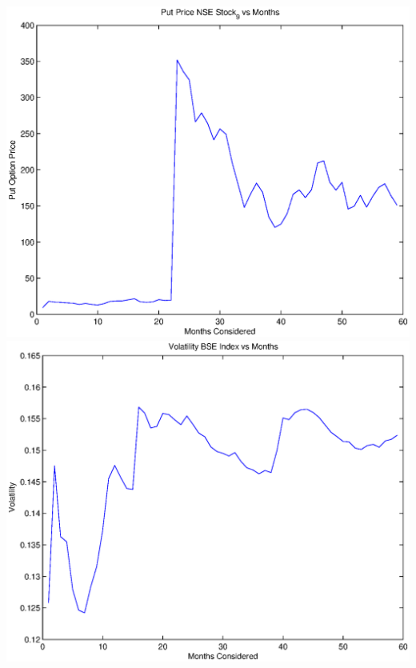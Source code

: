 \documentclass{article}
\begin{document}
\includegraphics[width=\textwidth]{Put_Price_NSE_Stock_9_vs_Months} \\

\includegraphics[width=\textwidth]{Volatility_BSE_Index_vs_Months} \\
\end{document}
